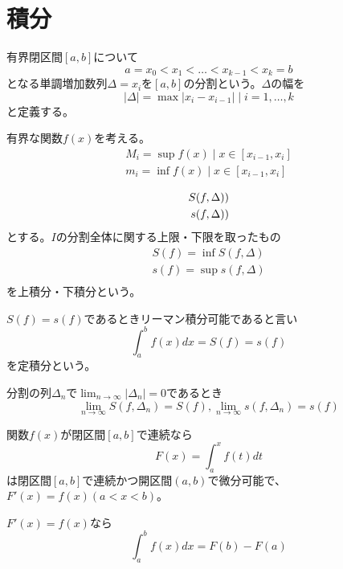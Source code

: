 \section{積分}

\begin{dfn}
	有界閉区間$[a, b]$について
		\[a = x_0 < x_1 < \dots < x_{k-1} < x_k = b\]
	となる単調増加数列$\Delta = {x_i}$を$[a, b]$の分割という。$\Delta$の幅を
		\[|\Delta| = \max{|x_i - x_{i-1}| \mid i = 1,\dots,k}\]
	と定義する。
\end{dfn}

\begin{dfn}
	有界な関数$f(x)$を考える。
	\begin{align*}
		M_i = \sup{f(x) \mid x \in [x_{i-1}, x_i]}\\
		m_i = \inf{f(x) \mid x \in [x_{i-1}, x_i]}\\
	\end{align*}
	\begin{align*}
		S(f, \Delta) \def \sum M_i(x_i - x_{i-1})\\
		s(f, \Delta) \def \sum m_i(x_i - x_{i-1})\\
	\end{align*}
	とする。$I$の分割全体に関する上限・下限を取ったもの
	\begin{align*}
		S(f) = \inf{S(f, \Delta)}\\
		s(f) = \sup{s(f, \Delta)}\\
	\end{align*}
	を上積分・下積分という。
\end{dfn}
\begin{dfn}[リーマン積分]
	$S(f) = s(f)$であるときリーマン積分可能であると言い
		\[\int_a^b f(x) dx = S(f) = s(f)\]
	を定積分という。
\end{dfn}
\begin{thm}[ダルブーの定理]
	分割の列${\Delta_n}$で$\lim_{n \to \infty} |\Delta_n| = 0$であるとき
		\[\lim_{n \to \infty} S(f, \Delta_n) = S(f), \lim_{n \to \infty} s(f, \Delta_n) = s(f)\]
\end{thm}

\begin{thm}
	関数$f(x)$が閉区間$[a, b]$で連続なら
		\[F(x) = \int_a^x f(t)dt\]
	は閉区間$[a, b]$で連続かつ開区間$(a, b)$で微分可能で、$F'(x) = f(x) (a < x < b)$。
\end{thm}
\begin{cor}
	$F'(x) = f(x)$なら
		\[\int_a^b f(x)dx = F(b) - F(a)\]
\end{cor}